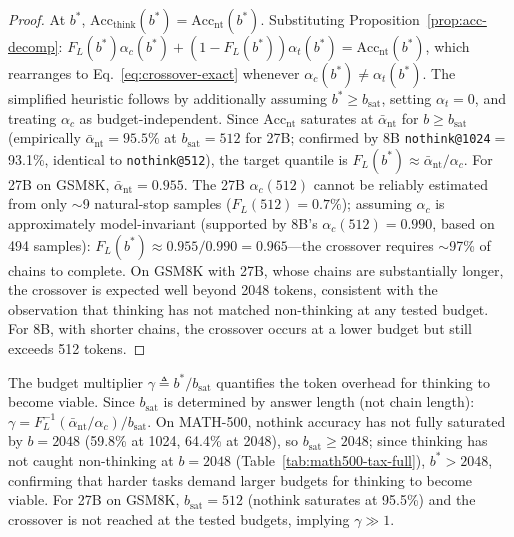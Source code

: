 \begin{proof}
At $b^*$, $\mathrm{Acc}_{\mathrm{think}}(b^*) = \mathrm{Acc}_{\mathrm{nt}}(b^*)$.
Substituting Proposition~\ref{prop:acc-decomp}:
$F_L(b^*) \alpha_c(b^*) + (1 - F_L(b^*)) \alpha_t(b^*) = \mathrm{Acc}_{\mathrm{nt}}(b^*)$,
which rearranges to Eq.~\eqref{eq:crossover-exact}
whenever $\alpha_c(b^*) \neq \alpha_t(b^*)$.
The simplified heuristic follows by additionally assuming
$b^* \ge b_{\mathrm{sat}}$,
setting $\alpha_t = 0$, and treating
$\alpha_c$ as budget-independent.
Since $\mathrm{Acc}_{\mathrm{nt}}$ saturates at $\bar{\alpha}_{\mathrm{nt}}$
for $b \ge b_{\mathrm{sat}}$ (empirically $\bar{\alpha}_{\mathrm{nt}} = 95.5\%$
at $b_{\mathrm{sat}} = 512$ for 27B; confirmed by 8B \texttt{nothink@1024}${=}$93.1\%, identical to \texttt{nothink@512}), the target quantile is
$F_L(b^*) \approx \bar{\alpha}_{\mathrm{nt}} / \alpha_c$.
For 27B on GSM8K, $\bar{\alpha}_{\mathrm{nt}} = 0.955$.
The 27B $\alpha_c(512)$ cannot be reliably estimated from only
${\sim}$9 natural-stop samples ($F_L(512) = 0.7\%$);
assuming $\alpha_c$ is approximately model-invariant
(supported by 8B's $\alpha_c(512) = 0.990$, based on 494 samples):
$F_L(b^*) \approx 0.955 / 0.990 = 0.965$---the crossover requires
${\sim}$97\% of chains to complete.
On GSM8K with 27B, whose chains are substantially longer, the crossover is expected well beyond 2048 tokens,
consistent with the observation that thinking has not matched non-thinking at any tested budget.
For 8B, with shorter chains, the crossover occurs at a lower budget but still exceeds 512 tokens.
\end{proof}

\begin{corollary}
\label{cor:multiplier}
The budget multiplier $\gamma \triangleq b^*/b_{\mathrm{sat}}$ quantifies
the token overhead for thinking to become viable.
Since $b_{\mathrm{sat}}$ is determined by answer length (not chain length):
$\gamma = F_L^{-1}(\bar{\alpha}_{\mathrm{nt}}/\alpha_c) \big/ b_{\mathrm{sat}}$.
On MATH-500, nothink accuracy has not fully saturated by $b{=}2048$
(59.8\% at 1024, 64.4\% at 2048), so $b_{\mathrm{sat}} \ge 2048$;
since thinking has not caught non-thinking at $b{=}2048$
(Table~\ref{tab:math500-tax-full}), $b^* > 2048$, confirming
that harder tasks demand larger budgets for thinking to become viable.
For 27B on GSM8K, $b_{\mathrm{sat}} = 512$ (nothink saturates at 95.5\%) and the crossover is not reached at the tested budgets, implying $\gamma \gg 1$.
\end{corollary}

